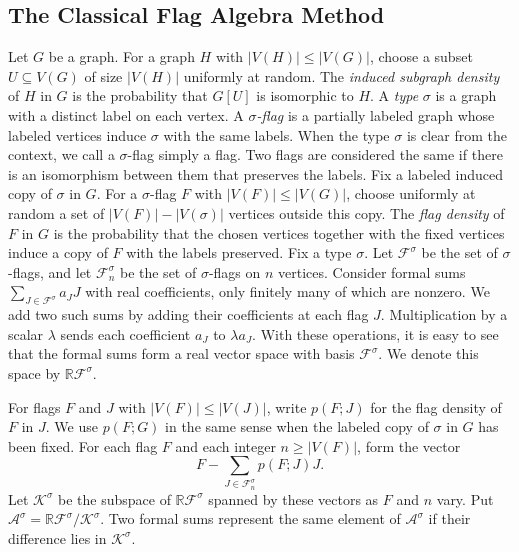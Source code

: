 \documentclass[preprint,11pt,numbers]{elsarticle-arxiv}
\numberwithin{equation}{section}
\theoremstyle{definition}
\begin{document}
\subsection{The Classical Flag Algebra Method}\label{subsec:flag-algebra}

Let $G$ be a graph. For a graph $H$ with $|V(H)|\leq |V(G)|$,
choose a subset $U\subseteq V(G)$ of size $|V(H)|$ uniformly at
random. The \emph{induced subgraph density} of $H$ in $G$ is the
probability that $G[U]$ is isomorphic to $H$. A \emph{type}
$\sigma$ is a graph with a distinct label on each vertex.
A \emph{$\sigma$-flag} is a partially labeled graph whose labeled
vertices induce $\sigma$ with the same labels. When the type
$\sigma$ is clear from the context, we call a $\sigma$-flag
simply a flag. Two flags are considered the same if there is an
isomorphism between them that preserves the labels. Fix a
labeled induced copy of $\sigma$ in $G$. For a $\sigma$-flag $F$
with $|V(F)|\leq |V(G)|$, choose uniformly at random a set of
$|V(F)|-|V(\sigma)|$ vertices outside this copy. The \emph{flag
density} of $F$ in $G$ is the probability that the chosen vertices
together with the fixed vertices induce a copy of $F$ with the
labels preserved. Fix a type $\sigma$. Let $\mathcal F^\sigma$
be the set of $\sigma$-flags, and let $\mathcal F^\sigma_n$ be
the set of $\sigma$-flags on $n$ vertices. Consider formal sums
$\sum_{J\in\mathcal F^\sigma}a_JJ$ with real coefficients, only
finitely many of which are nonzero. We add two such sums by
adding their coefficients at each flag $J$. Multiplication by
a scalar $\lambda$ sends each coefficient $a_J$ to $\lambda a_J$.
With these operations, it is easy to see that the formal sums
form a real vector space with basis $\mathcal F^\sigma$. We
denote this space by $\mathbb R\mathcal F^\sigma$.

For flags $F$ and $J$ with $|V(F)|\leq |V(J)|$, write $p(F;J)$
for the flag density of $F$ in $J$. We use $p(F;G)$ in the same
sense when the labeled copy of $\sigma$ in $G$ has been fixed.
For each flag $F$ and each
integer $n\geq |V(F)|$, form the vector
\[
  F-\sum_{J\in\mathcal F^\sigma_n}p(F;J)J.
\]
Let $\mathcal K^\sigma$ be the subspace of
$\mathbb R\mathcal F^\sigma$ spanned by these vectors as $F$
and $n$ vary. Put
$\mathcal A^\sigma=\mathbb R\mathcal F^\sigma/\mathcal K^\sigma$.
Two formal sums represent the same element of $\mathcal A^\sigma$
if their difference lies in $\mathcal K^\sigma$.
\end{document}
